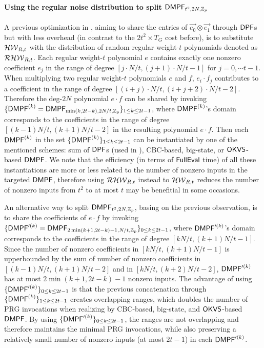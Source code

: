 \paragraph{Using the regular noise distribution to split ${\sf DMPF}_{t^2, 2N, \mathbb{Z}_p}$}

A previous optimization in \cite{cryptoeprint:2022/1035}, aiming to share the entries of $\vec{e_0}\otimes \vec{e_1}$ through ${\sf DPF}$s but with less overhead (in contrast to the $2t^2\times T_G$ cost before), is to substitute $\mathcal{HW}_{R,t}$ with the distribution of random regular weight-$t$ polynomials denoted as $\mathcal{RHW}_{R,t}$. Each regular weight-$t$ polynomial $e$ contains exactly one nonzero coefficient $e_j$ in the range of degree $[j\cdot N/t, (j+1)\cdot N/t-1]$ for $j=0,\cdots t-1$. When multiplying two regular weight-$t$ polynomials $e$ and $f$, $e_i\cdot f_j$ contributes to a coefficient in the range of degree $[(i+j)\cdot N/t, (i+j+2)\cdot N/t-2]$. Therefore the deg-$2N$ polynomial $e\cdot f$ can be shared by invoking $\{{\sf DMPF}^{(k)} = {\sf DMPF}_{\min(k,2t-k), 2N/t, \mathbb{Z}_p}\}_{1\le k\le 2t-1}$, where ${\sf DMPF}^{(k)}$'s domain corresponds to the coefficients in the range of degree $[(k-1)N/t, (k+1)N/t-2]$ in the resulting polynomial $e\cdot f$. Then each ${\sf DMPF}^{(k)}$ in the set $\{{\sf DMPF}^{(k)}\}_{1\le k\le 2t-1}$ can be instantiated by one of the mentioned schemes: sum of ${\sf DPF}$s (used in \cite{cryptoeprint:2022/1035}), CBC-based, big-state, or ${\sf OKVS}$-based ${\sf DMPF}$. We note that the efficiency (in terms of ${\sf FullEval}$ time) of all these instantiations are more or less related to the number of nonzero inputs in the targeted ${\sf DMPF}$, therefore using $\mathcal{RHW}_{R,t}$ instead to $\mathcal{HW}_{R,t}$ reduces the number of nonzero inputs from $t^2$ to at most $t$ may be benefitial in some occasions.

An alternative way to split ${\sf DMPF}_{t^2, 2N, \mathbb{Z}_p}$, basing on the previous observation, is to share the coefficients of $e\cdot f$ by invoking $\{{\sf DMPF}'^{(k)} = {\sf DMPF}_{2\min(k+1, 2t-k)-1, N/t, \mathbb{Z}_p}\}_{0\le k\le 2t-1}$, where ${\sf DMPF}'^{(k)}$'s domain corresponds to the coefficients in the range of degree $[kN/t, (k+1)N/t -1]$. Since the number of nonzero coefficients in $[kN/t, (k+1)N/t -1]$ is upperbounded by the sum of number of nonzero coefficients in $[(k-1)N/t, (k+1)N/t -2]$ and in $[kN/t, (k+2)N/t -2]$, ${\sf DMPF}'^{(k)}$ has at most $2\min(k+1, 2t-k)-1$ nonzero inputs. The advantage of using $\{{\sf DMPF}'^{(k)}\}_{0\le k\le 2t-1}$ is that the previous concatenation through $\{{\sf DMPF}^{(k)}\}_{1\le k\le 2t-1}$ creates overlapping ranges, which doubles the number of PRG invocations when realizing by CBC-based, big-state, and ${\sf OKVS}$-based ${\sf DMPF}$. By using $\{{\sf DMPF}'^{(k)}\}_{0\le k\le 2t-1}$, the ranges are not overlapping and therefore maintains the minimal PRG invocations, while also preserving a relatively small number of nonzero inputs (at most $2t-1$) in each ${\sf DMPF}'^{(k)}$. 

